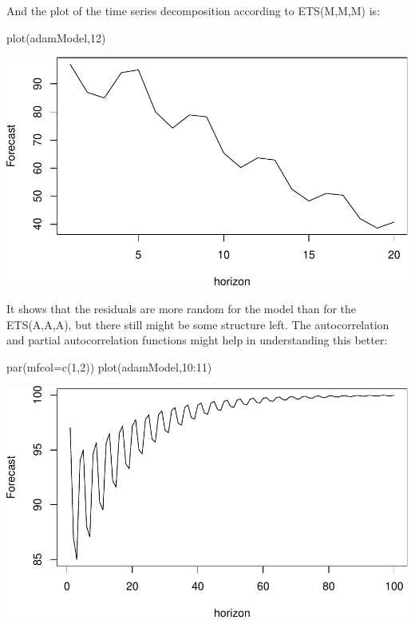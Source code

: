 \documentclass[
]{book}
\newenvironment{Shaded}{\begin{snugshade}}{\end{snugshade}}
\newcommand{\AttributeTok}[1]{\textcolor[rgb]{0.77,0.63,0.00}{#1}}
\newcommand{\DecValTok}[1]{\textcolor[rgb]{0.00,0.00,0.81}{#1}}
\newcommand{\FunctionTok}[1]{\textcolor[rgb]{0.00,0.00,0.00}{#1}}
\newcommand{\NormalTok}[1]{#1}
\newcommand{\SpecialCharTok}[1]{\textcolor[rgb]{0.00,0.00,0.00}{#1}}
\theoremstyle{definition}
\theoremstyle{definition}
\theoremstyle{definition}
\theoremstyle{definition}
\theoremstyle{remark}
\begin{document}
And the plot of the time series decomposition according to ETS(M,M,M) is:

\begin{Shaded}
\begin{Highlighting}[]
\FunctionTok{plot}\NormalTok{(adamModel,}\DecValTok{12}\NormalTok{)}
\end{Highlighting}
\end{Shaded}

\includegraphics{adam_files/figure-latex/unnamed-chunk-42-1.pdf}

It shows that the residuals are more random for the model than for the ETS(A,A,A), but there still might be some structure left. The autocorrelation and partial autocorrelation functions might help in understanding this better:

\begin{Shaded}
\begin{Highlighting}[]
\FunctionTok{par}\NormalTok{(}\AttributeTok{mfcol=}\FunctionTok{c}\NormalTok{(}\DecValTok{1}\NormalTok{,}\DecValTok{2}\NormalTok{))}
\FunctionTok{plot}\NormalTok{(adamModel,}\DecValTok{10}\SpecialCharTok{:}\DecValTok{11}\NormalTok{)}
\end{Highlighting}
\end{Shaded}

\includegraphics{adam_files/figure-latex/unnamed-chunk-43-1.pdf}
\end{document}

